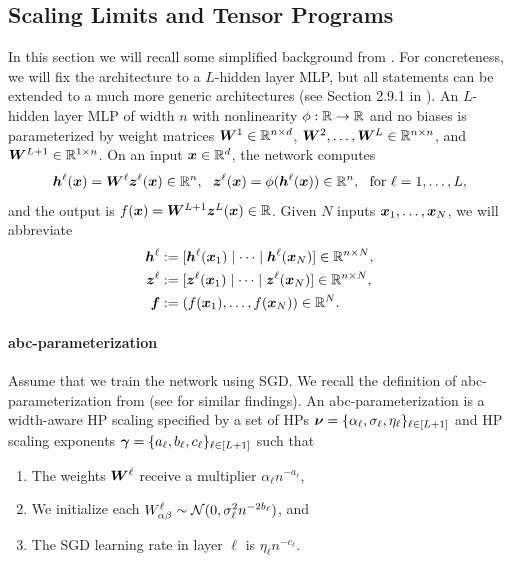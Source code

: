 \subsection{Scaling Limits and Tensor Programs}\label{app:tensor_programs}
In this section we will recall some simplified background from \citep{yang2021tensor, yang2023tensor}. For concreteness, we will fix the architecture to a $L$-hidden layer MLP, but all statements can be extended to a much more generic architectures (see Section 2.9.1 in \citep{yang2023tensor}). An $L$-hidden layer MLP of width $n$ with nonlinearity $\phi : \mathbb{R} \to \mathbb{R}$ and no biases is parameterized by weight matrices ${\boldsymbol W}^1 \in \mathbb{R}^{n \times d}$, ${\boldsymbol W}^2, \ldots, {\boldsymbol W}^L \in \mathbb{R}^{n \times n}$, and ${\boldsymbol W}^{L+1} \in \mathbb{R}^{1 \times n}$. On an input ${\boldsymbol x} \in \mathbb{R}^d$, the network computes
\begin{equation}\label{eq:mlp}
    {\boldsymbol h}^\ell({\boldsymbol x}) = {\boldsymbol W}^{\ell} {\boldsymbol z}^{\ell}({\boldsymbol x}) \in \mathbb{R}^n,~~{\boldsymbol z}^{\ell}({\boldsymbol x}) = \phi({\boldsymbol h}^{\ell}({\boldsymbol x})) \in \mathbb{R}^n,~~\text{for } \ell = 1, \ldots, L,
\end{equation}
and the output is $f({\boldsymbol x}) = {\boldsymbol W}^{L+1} {\boldsymbol z}^{L}({\boldsymbol x}) \in \mathbb{R}$. Given $N$ inputs ${\boldsymbol x}_1, \ldots, {\boldsymbol x}_N$, we will abbreviate
\begin{align*}
    {\boldsymbol h}^\ell &:= [{\boldsymbol h}^\ell({\boldsymbol x}_1) \mid \cdots \mid {\boldsymbol h}^\ell({\boldsymbol x}_N)] \in \mathbb{R}^{n \times N}, \\
    {\boldsymbol z}^\ell &:= [{\boldsymbol z}^\ell({\boldsymbol x}_1) \mid \cdots \mid {\boldsymbol z}^\ell({\boldsymbol x}_N)] \in \mathbb{R}^{n \times N}, \\
    {\boldsymbol f}   &:= (f({\boldsymbol x}_1), \ldots, f({\boldsymbol x}_N)) \in \mathbb{R}^N.
\end{align*}
\paragraph{abc-parameterization} 
Assume that we train the network using SGD. We recall the definition of abc-parameterization from \citep{yang2021tensor} (see \cite{geiger2020disentangling,chizat2024feature} for similar findings). An abc-parameterization is a width-aware HP scaling specified by a set of HPs $\bm{\nu} = \{\alpha_\ell, \sigma_\ell, \eta_\ell\}_{\ell \in [L+1]}$ and HP scaling exponents $\bm{\gamma} = \{a_\ell, b_\ell, c_\ell\}_{\ell \in [L+1]}$ such that
\begin{enumerate}[label=(\alph*)]
    \item The weights ${\boldsymbol W}^{\ell}$ receive a multiplier $\alpha_\ell n^{-a_\ell}$,
    \item We initialize each $W_{\alpha \beta}^\ell \sim {\mathcal N}(0, \sigma^2_\ell n^{-2b_\ell})$, and
    \item The SGD learning rate in layer $\ell$ is $\eta_\ell n^{-c_\ell}$.
\end{enumerate}

